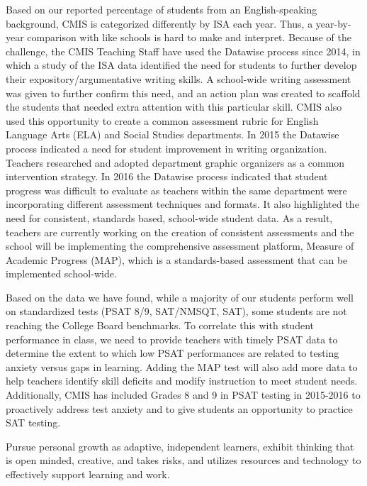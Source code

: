 
Based on our reported percentage of students from an English-speaking background, CMIS is categorized differently by ISA each year. Thus, a year-by-year comparison with like schools is hard to make and interpret. Because of the challenge, the CMIS Teaching Staff have used the Datawise process since 2014, in which a study of the ISA data identified the need for students to further develop their expository/argumentative writing skills.  A school-wide writing assessment was given to further confirm this need, and an action plan was created to scaffold the students that needed extra attention with this particular skill. CMIS also used this opportunity to create a common assessment rubric for English Language Arts (ELA) and Social Studies departments. In 2015 the Datawise process indicated a need for student improvement in writing organization. Teachers researched and adopted department graphic organizers as a common intervention strategy. In 2016 the Datawise process indicated that student progress was difficult to evaluate as teachers within the same department were incorporating different assessment techniques and formats. It also highlighted the need for consistent, standards based, school-wide student data. As a result, teachers are currently working on the creation of consistent assessments and the school will be implementing the comprehensive assessment platform, Measure of Academic Progress (MAP), which is a standards-based assessment that can be implemented school-wide.

Based on the data we have found, while a majority of our students perform well on standardized tests (PSAT 8/9, SAT/NMSQT, SAT), some students are not reaching the College Board benchmarks. To correlate this with student performance in class, we need to provide teachers with timely PSAT data to determine the extent to which low PSAT performances are related to testing anxiety versus gaps in learning. Adding the MAP test will also add more data to help teachers identify skill deficits and modify instruction to meet student needs. Additionally, CMIS has included Grades 8 and 9 in PSAT testing in 2015-2016 to proactively address test anxiety and to give students an opportunity to practice SAT testing. 


Pursue personal growth as adaptive, independent learners, exhibit thinking that is open minded, creative, and takes risks, and utilizes resources and technology to effectively support learning and work.


